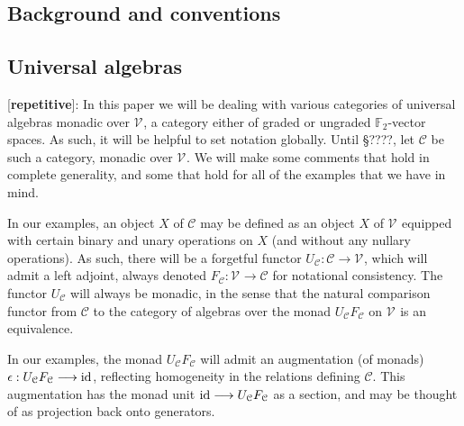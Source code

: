 \documentclass[11pt]{amsart}
\theoremstyle{plain}
\theoremstyle{definition}
\renewcommand{\to}{\longrightarrow}
\newcommand{\calW}{\mathcal{W}}
\newcommand{\calU}{\mathcal{U}}
\newcommand{\calL}{\mathcal{L}}
\newcommand{\calC}{\mathcal{C}}
\newcommand{\calV}{\mathcal{V}}
\theoremstyle{plain}
\newcommand{\vect}[2]{\calV^{#1}_{#2}}
\newcommand{\F}{\mathbb{F}}
\newcommand{\Id}{\textup{id}}
\begin{document}
\begin{Conventions and notation}
\section{\textbf{Background and conventions}}

\subsection{Universal algebras}
[\textbf{repetitive}]: In this paper we will be dealing with various categories of universal algebras \cite[\S2.1]{Blanc_Stover-Groth_SS.pdf} monadic over $\vect{}{}$, a category either of graded or ungraded $\F_2$-vector spaces.
As such, it will be helpful to set notation globally. %
Until \S????, let $\calC$ be such a category, monadic over $\vect{}{}$. We will make some comments that hold in complete generality, and some that hold for all of the examples that we have in mind.

In our examples, an object $X$ of $\calC$ may be defined as an object $X$ of $\vect{}{}$ equipped with certain binary and unary operations on $X$ (and without any nullary operations). As such, there will be a forgetful functor $U_\calC:\calC\to\vect{}{}$, which will admit a left adjoint, always denoted $F_\calC:\vect{}{}\to\calC$ for notational consistency. The functor $U_{\calC}$ will always be monadic, in the sense that the natural comparison functor from $\calC$ to the category of algebras over the monad $U_{\calC}F_{\calC}$ on $\vect{}{}$ is an equivalence.

In our examples, the monad $U_{\calC}F_{\calC}$ will admit an augmentation (of monads) $\epsilon:U_{\calC}F_{\calC}\to\Id$, reflecting homogeneity in the relations defining $\calC$. This augmentation has the monad unit $\Id\to U_{\calC}F_{\calC}$ as a section, and may be thought of as projection back onto generators.



\end{Conventions and notation}
\end{document}
